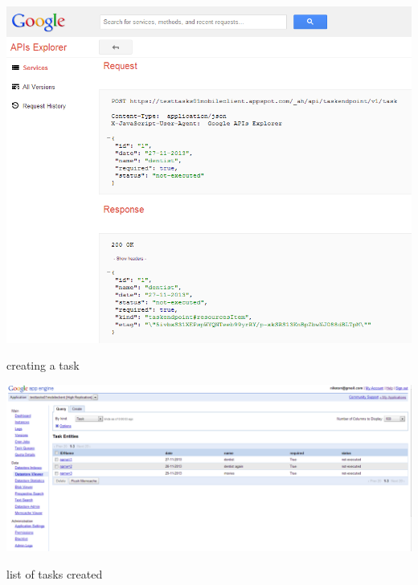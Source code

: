 \begin{center}
	\centering
	\includegraphics[scale=0.7]{images/googlecloud__createtask.png}
	\caption{creating a task}
	\label{mobile_json_figure}
\end{center}
\begin{center}
	\centering
	\includegraphics[scale=0.5]{images/googlecloud__taskexist.png}
	\caption{list of tasks created}
	\label{mobile_task_list_figure}
\end{center}

